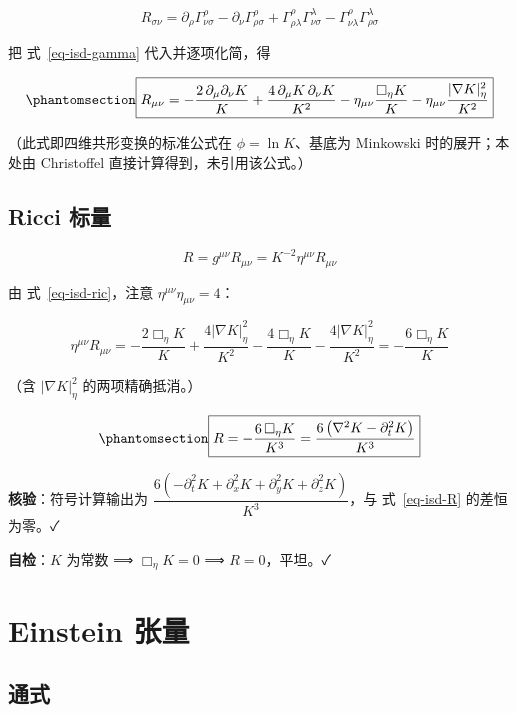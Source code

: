 \documentclass[
  chinese,
  a4paper,
  UTF8,
  12pt,
  oneside,
  openany]{ctexbook}
\theoremstyle{plain}
\theoremstyle{plain}
\theoremstyle{plain}
\theoremstyle{definition}
\theoremstyle{plain}
\theoremstyle{plain}
\theoremstyle{remark}
\begin{document}
\[
R_{\sigma\nu}=\partial_\rho\Gamma^{\rho}_{\nu\sigma}
-\partial_\nu\Gamma^{\rho}_{\rho\sigma}
+\Gamma^{\rho}_{\rho\lambda}\Gamma^{\lambda}_{\nu\sigma}
-\Gamma^{\rho}_{\nu\lambda}\Gamma^{\lambda}_{\rho\sigma}
\]

把 式~\ref{eq-isd-gamma} 代入并逐项化简，得

\begin{equation}\protect\phantomsection\label{eq-isd-ric}{
\boxed{R_{\mu\nu}=
-\frac{2\,\partial_\mu\partial_{\nu}K}{K}
+\frac{4\,\partial_{\mu}K\,\partial_{\nu}K}{K^{2}}
-\eta_{\mu\nu}\frac{\Box_\eta K}{K}
-\eta_{\mu\nu}\frac{\lvert\nabla K\rvert^{2}_{\eta}}{K^{2}}}
}\end{equation}

（此式即四维共形变换的标准公式在 \(\phi=\ln K\)、基底为 Minkowski
时的展开；本处由 Christoffel 直接计算得到，未引用该公式。）

\subsection{Ricci 标量}\label{ricci-ux6807ux91cf-1}

\[
R=g^{\mu\nu}R_{\mu\nu}=K^{-2}\eta^{\mu\nu}R_{\mu\nu}
\]

由 式~\ref{eq-isd-ric}，注意 \(\eta^{\mu\nu}\eta_{\mu\nu}=4\)：

\[
\eta^{\mu\nu}R_{\mu\nu}=
-\frac{2\Box_\eta K}{K}+\frac{4\lvert\nabla K\rvert^{2}_{\eta}}{K^{2}}
-\frac{4\Box_\eta K}{K}-\frac{4\lvert\nabla K\rvert^{2}_{\eta}}{K^{2}}
=-\frac{6\Box_\eta K}{K}
\]

（含 \(\lvert\nabla K\rvert^{2}_{\eta}\) 的两项精确抵消。）

\begin{equation}\protect\phantomsection\label{eq-isd-R}{
\boxed{R=-\frac{6\,\Box_\eta K}{K^{3}}
=\frac{6\,\bigl(\nabla^{2}K-\partial_t^{2}K\bigr)}{K^{3}}}
}\end{equation}

\textbf{核验}：符号计算输出为
\(\dfrac{6(-\partial_t^{2}K+\partial_x^{2}K+\partial_y^{2}K+\partial_z^{2}K)}{K^{3}}\)，与
式~\ref{eq-isd-R} 的差恒为零。✓

\textbf{自检}：\(K\) 为常数 ⟹ \(\Box_\eta K=0\) ⟹ \(R=0\)，平坦。✓

\section{Einstein 张量}\label{sec-isd-einstein}

\subsection{通式}\label{ux901aux5f0f}
\end{document}
